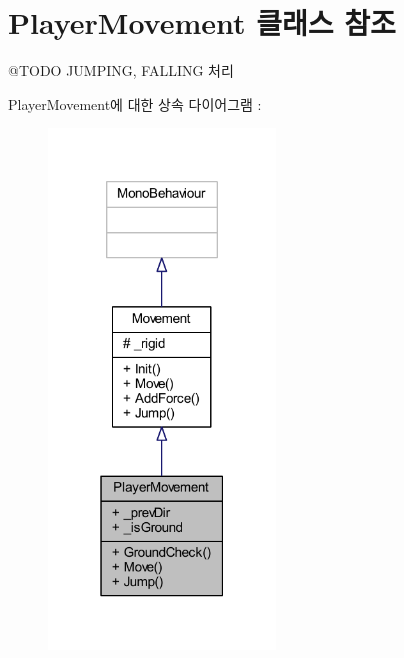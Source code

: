 \hypertarget{class_player_movement}{}\section{Player\+Movement 클래스 참조}
\label{class_player_movement}


@\+T\+O\+DO J\+U\+M\+P\+I\+NG, F\+A\+L\+L\+I\+NG 처리  




Player\+Movement에 대한 상속 다이어그램 \+: 
\nopagebreak
\begin{figure}[H]
\begin{center}
\leavevmode
\includegraphics[width=171pt]{de/d46/class_player_movement__inherit__graph}
\end{center}
\end{figure}


